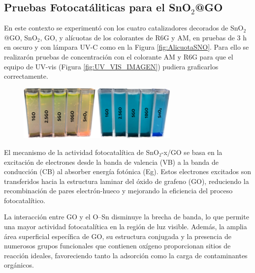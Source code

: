 \documentclass[12pt]{article}
\begin{document}
\subsection{Pruebas Fotocatáliticas para el SnO$\displaystyle _{2}$@GO}
En este contexto se experimentó con los cuatro catalizadores decorados de SnO$\displaystyle _{2}$@GO, SnO$\displaystyle _{2}$, GO, y alícuotas de los colorantes de R6G y AM, en pruebas de 3 h en oscuro y con lámpara UV-C como en la Figura \ref{fig:AlicuotaSNO}. 
Para ello se realizarón pruebas de concentración con el colorante AM y R6G para que el equipo de UV-vis (Figura \ref{fig:UV_VIS_IMAGEN}) pudiera graficarlos correctamente.
\begin{figure}[H]
    	   \begin{center}
     	  	\includegraphics[width = 0.7\textwidth]{Imagenes/SnO2_FOTO.png}
    	   \end{center} 
        \end{figure}
El mecanismo de la actividad fotocatalítica de SnO₂-x/GO se basa en la excitación de electrones desde la banda de valencia (VB) a la banda de conducción (CB) al absorber energía fotónica (Eg). Estos electrones excitados son transferidos hacia la estructura laminar del óxido de grafeno (GO), reduciendo la recombinación de pares electrón-hueco y mejorando la eficiencia del proceso fotocatalítico. \vspace{1em} %

La interacción entre GO y el O–Sn disminuye la brecha de banda, lo que permite una mayor actividad fotocatalítica en la región de luz visible. Además, la amplia área superficial específica de GO, su estructura conjugada y la presencia de numerosos grupos funcionales que contienen oxígeno proporcionan sitios de reacción ideales, favoreciendo tanto la adsorción como la carga de contaminantes orgánicos.\vspace{1em} %
\end{document}
